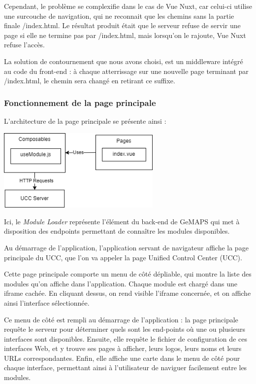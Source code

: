 \documentclass[francais]{rapportPFE}  %
\begin{document}
    Cependant, le problème se complexifie dans le cas de Vue Nuxt, car celui-ci utilise une surcouche de navigation, qui ne reconnait que les chemins sans la partie finale /index.html. Le résultat produit était que le serveur refuse de servir une page si elle ne termine pas par /index.html, mais lorsqu'on le rajoute, Vue Nuxt refuse l'accès.

    La solution de contournement que nous avons choisi, est un middleware intégré au code du front-end : à chaque atterrissage sur une nouvelle page terminant par /index.html, le chemin sera changé en retirant ce suffixe.






\subsubsection{Fonctionnement de la page principale}

L'architecture de la page principale se présente ainsi :

\begin{center}
    \centering
    \centering
    \includegraphics[width=8cm]{graphics/uccnuxt.png}
    \label{fig:test1}
\end{center}

Ici, le \textit{Module Loader} représente l'élément du back-end de GeMAPS qui met à disposition des endpoints permettant de connaître les modules disponibles.

Au démarrage de l'application, l'application servant de navigateur affiche la page principale du UCC, que l'on va appeler la page Unified Control Center (UCC).

Cette page principale comporte un menu de côté dépliable, qui montre la liste des modules qu'on affiche dans l'application. Chaque module est chargé dans une iframe cachée. En cliquant dessus, on rend visible l'iframe concernée, et on affiche ainsi l'interface sélectionnée.

Ce menu de côté est rempli au démarrage de l'application : la page principale requête le serveur pour déterminer quels sont les end-points où une ou plusieurs interfaces sont disponibles. Ensuite, elle requête le fichier de configuration de ces interfaces Web, et y trouve ses pages à afficher, leurs logos, leurs noms et leurs URLs correspondantes. Enfin, elle affiche une carte dans le menu de côté pour chaque interface, permettant ainsi à l'utilisateur de naviguer facilement entre les modules.
\end{document}

